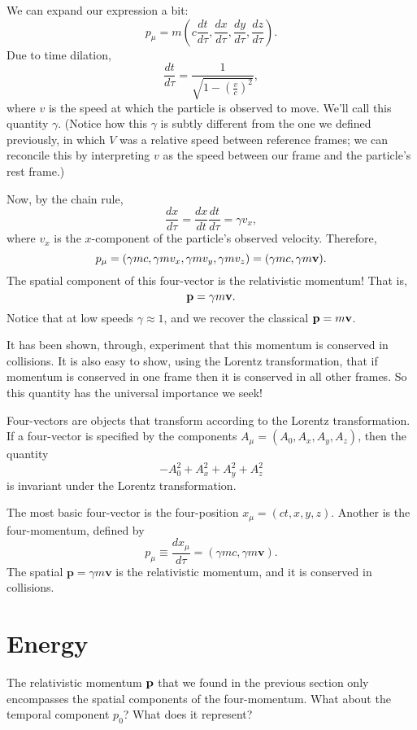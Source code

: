 \documentclass[../p023main.tex]{subfiles}
\begin{document}
We can expand our expression a bit:
\[ p_\mu = m \left( c \frac{dt}{d\tau}, \frac{dx}{d\tau}, \frac{dy}{d\tau}, \frac{dz}{d\tau} \right). \]
Due to time dilation,
\[ \frac{dt}{d\tau} = \frac{1}{\sqrt{1 - \left( \frac{v}{c} \right)^2}}, \]
where $v$ is the speed at which the particle is observed to move.
We'll call this quantity $\gamma$.
(Notice how this $\gamma$ is subtly different from the one we defined previously, in which $V$ was a relative speed between reference frames; we can reconcile this by interpreting $v$ as the speed between our frame and the particle's rest frame.)

Now, by the chain rule,
\[ \frac{dx}{d\tau} = \frac{dx}{dt} \frac{dt}{d\tau} = \gamma v_x, \]
where $v_x$ is the $x$-component of the particle's observed velocity.
Therefore,
\[ p_\mu = (\gamma mc, \gamma mv_x, \gamma mv_y, \gamma mv_z) = (\gamma mc, \gamma m\mathbf{v}). \]
The spatial component of this four-vector is the relativistic momentum!
That is,
\[ \mathbf{p} = \gamma m\mathbf{v}. \]
Notice that at low speeds $\gamma \approx 1$, and we recover the classical $\mathbf{p} = m\mathbf{v}$.

It has been shown, through, experiment that this momentum is conserved in collisions.
It is also easy to show, using the Lorentz transformation, that if momentum is conserved in one frame then it is conserved in all other frames.
So this quantity has the universal importance we seek!

\begin{summary}
    Four-vectors are objects that transform according to the Lorentz transformation. If a four-vector is specified by the components $A_\mu = (A_0, A_x, A_y, A_z)$, then the quantity
    \[ -A_0^2 + A_x^2 + A_y^2 + A_z^2 \]
    is invariant under the Lorentz transformation.

    The most basic four-vector is the four-position $x_\mu = (ct, x, y, z)$. Another is the four-momentum, defined by
    \[ p_\mu \equiv \frac{dx_\mu}{d\tau} = (\gamma mc, \gamma m\mathbf{v}). \]
    The spatial $\mathbf{p} = \gamma m \mathbf{v}$ is the relativistic momentum, and it is conserved in collisions.
\end{summary}

\section{Energy}
The relativistic momentum $\mathbf{p}$ that we found in the previous section only encompasses the spatial components of the four-momentum.
What about the temporal component $p_0$?
What does it represent?
\end{document}
